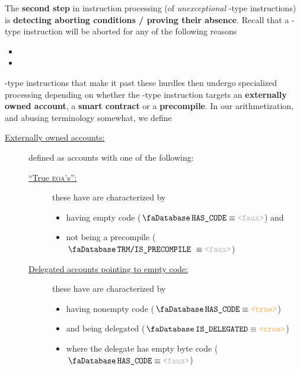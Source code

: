 The \textbf{second step} in instruction processing (of \emph{unexceptional} -type instructions) is \textbf{detecting aborting conditions / proving their absence}.
Recall that a -type instruction will be aborted for any of the following reasons
\begin{itemize}
	\item \balAbortSH{}
	\item \csdAbortSH{}
\end{itemize}
-type instructions that make it past these hurdles then undergo specialized processing depending on whether the -type instruction targets
an \textbf{externally owned account},
a  \textbf{smart contract} or
a  \textbf{precompile}.
In our arithmetization,
and abusing terminology somewhat,
we define
\begin{description}
	\item[\underline{\underline{Externally owned accounts:}}]
		defined as accounts with
		one of the following:
		\begin{description}
			\item[\underline{``True \textsc{eoa}'s'':}]
				these have are characterized by
				\begin{itemize}
					\item having empty code ($\accHasCode \equiv \false$) and
					\item not being a precompile ($\accTrmIsPrecompile \equiv \false$)
				\end{itemize}
			\item[\underline{Delegated accounts pointing to empty code:}]
				these have are characterized by
				\begin{itemize}
					\item having nonempty code ($\accHasCode \equiv \true$)
					\item and being delegated ($\accIsDelegated \equiv \true$)
					\item where the delegate has empty byte code ($\accHasCode \equiv \false$)
				\end{itemize}

\end{description}
\end{description}
